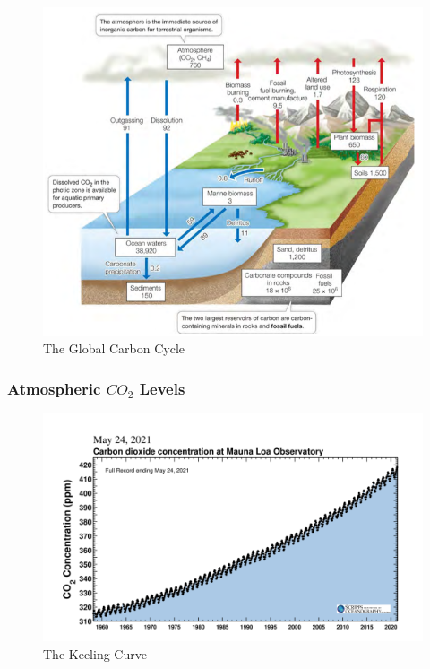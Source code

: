 \documentclass[12pt]{article}
\begin{document}
\begin{figure}[H]
    \centering
    \includegraphics[width=5in]{global-carbon-cycle.png}
    \caption{The Global Carbon Cycle}
    \label{global-carbon}
\end{figure}

\subsubsection[Atmospheric Carbon Dioxide Levels]{Atmospheric $CO_2$ Levels}

\begin{figure}[tph]
    \centering
    \includegraphics[width=5in]{keeling-curve.png}
    \caption{The Keeling Curve}
    \label{keeling-curve}
\end{figure}
\end{document}
